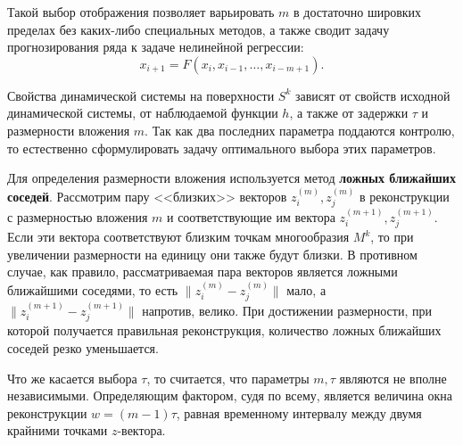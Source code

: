 Такой выбор отображения позволяет варьировать $m$ в достаточно шировких пределах без каких-либо специальных методов, а также сводит задачу прогнозирования ряда к задаче нелинейной регрессии:
\begin{equation*}
    x_{i+1} = F\left( x_i, x_{i-1}, \dots, x_{i-m+1} \right).
\end{equation*}


Свойства динамической системы на поверхности $S^k$ зависят от свойств исходной динамической системы, от наблюдаемой функции $h$, а также от задержки $\tau$ и размерности вложения $m$.
Так как два последних параметра поддаются контролю, то естественно сформулировать задачу оптимального выбора этих параметров.

Для определения размерности вложения используется метод \textbf{ложных ближайших соседей}.
Рассмотрим пару <<близких>> векторов $z_i^{(m)}, z_j^{(m)}$ в реконструкции с размерностью вложения $m$ и соответствующие им вектора $z_i^{(m+1)}, z_j^{(m+1)}$.
Если эти вектора соответствуют близким точкам многообразия $M^k$, то при увеличении размерности на единицу они также будут близки.
В противном случае, как правило, рассматриваемая пара векторов является ложными ближайшими соседями, то есть $\| z_i^{(m)} - z_j^{(m)}\|$ мало, а $\| z_i^{(m+1)} - z_j^{(m+1)} \|$ напротив, велико.
При достижении размерности, при которой получается правильная реконструкция, количество ложных ближайших соседей резко уменьшается.

Что же касается выбора $\tau$, то считается, %
что параметры $m, \tau$ являются не вполне независимыми.
Определяющим фактором, судя по всему, является величина окна реконструкции $w = (m-1)\tau$, равная временному интервалу между двумя крайними точками $z$-вектора.




